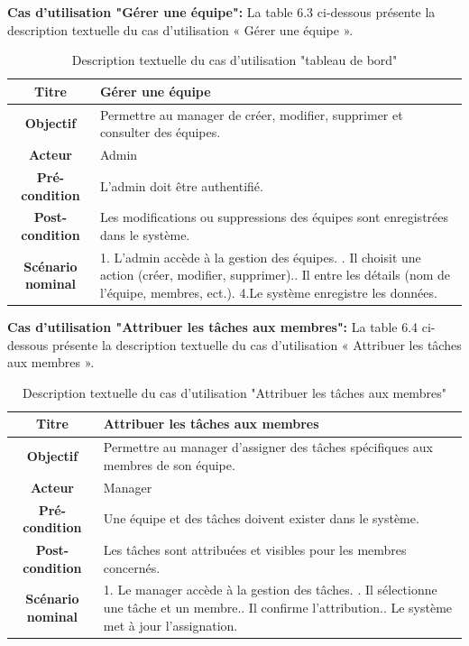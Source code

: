       \item \textbf{Cas d'utilisation "Gérer une équipe": } La table 6.3 ci-dessous présente la description textuelle du cas d'utilisation « Gérer une équipe ».
 \begin{table}[H]
  \caption{ Description textuelle du cas d’utilisation "tableau de bord"}
    \centering
    \begin{tabular}{|c|p{12cm}|}
    \hline
    \textbf{Titre} & Gérer une équipe \\
    \hline
    \textbf{Objectif} & Permettre au manager de créer, modifier, supprimer et consulter des équipes. \\
    \hline
    \textbf{Acteur}& Admin\\
    \hline
    \textbf{Pré-condition} & L'admin doit être authentifié.
    \\
    \hline
    \textbf{Post-condition} & Les modifications ou suppressions des équipes sont enregistrées dans le système.\\
    \hline
    \textbf{Scénario nominal} & 1. L'admin accède à la gestion des équipes. \newline
    2. Il choisit une action (créer, modifier, supprimer).\newline
    3. Il entre les détails (nom de l’équipe, membres, ect.).
    \newline
    4.Le système enregistre les données.\\
    \hline
    \end{tabular}
    \label{tab:user_stories}
\end{table}

      \item \textbf{Cas d'utilisation "Attribuer les tâches aux membres": } La table 6.4 ci-dessous présente la description textuelle du cas d'utilisation « Attribuer les tâches aux membres ».
 \begin{table}[H]
 \caption{ Description textuelle du cas d’utilisation "Attribuer les tâches aux membres"}
    \centering
    \begin{tabular}{|c|p{12cm}|}
    \hline
    \textbf{Titre} & Attribuer les tâches aux membres \\
    \hline
    \textbf{Objectif} & Permettre au manager d’assigner des tâches spécifiques aux membres de son équipe. \\
    \hline
    \textbf{Acteur}& Manager\\
    \hline
    \textbf{Pré-condition} & Une équipe et des tâches doivent exister dans le système.
    \\
    \hline
    \textbf{Post-condition} & Les tâches sont attribuées et visibles pour les membres concernés.\\
    \hline
    \textbf{Scénario nominal} & 1. Le manager accède à la gestion des tâches. \newline
    2. Il sélectionne une tâche et un membre.\newline
    3. Il confirme l’attribution.\newline
    4. Le système met à jour l’assignation.\\
    \hline
    \end{tabular}
    \label{tab:user_stories}
\end{table}

